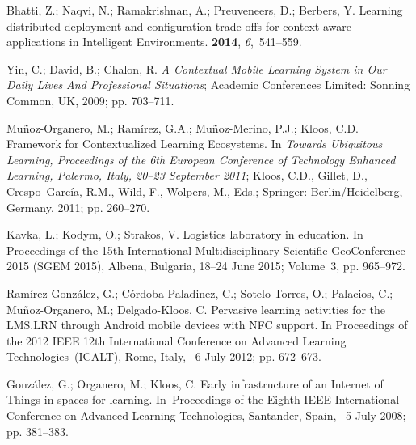 \documentclass[symmetry,article,accept,moreauthors,pdftex10pt,a4paper]{mdpi}
\begin{document}
\begin{thebibliography}{999}
Bhatti, Z.; Naqvi, N.; Ramakrishnan, A.; Preuveneers, D.; Berbers, Y.
\newblock Learning distributed deployment and configuration trade-offs for
context-aware applications in Intelligent Environments.
 {\bf
	2014}, {\em 6},~541--559.

Yin, C.; David, B.; Chalon, R.
\newblock \emph{A Contextual Mobile Learning System in Our Daily Lives And
	Professional Situations};
\newblock Academic Conferences Limited: Sonning Common, UK, 2009; pp. 703--711.

Mu{\~{n}}oz-Organero, M.; Ram{\'i}rez, G.A.; Mu{\~{n}}oz-Merino, P.J.; Kloos,
C.D. Framework for Contextualized Learning Ecosystems.
\newblock In {\em Towards Ubiquitous Learning, Proceedings of the 6th European Conference of
	Technology Enhanced Learning, Palermo, Italy, 20--23 September 
	2011}; Kloos, C.D., Gillet, D., Crespo~Garc{\'i}a, R.M., Wild,
F., Wolpers, M., Eds.; Springer: Berlin/Heidelberg, Germany, 2011;
pp. 260--270.

Kavka, L.; Kodym, O.; Strakos, V.
\newblock Logistics laboratory in education.
\newblock In Proceedings of the 15th International Multidisciplinary Scientific GeoConference 2015 (SGEM 2015), Albena, Bulgaria, 18--24 June 2015;
Volume~3, pp. 965--972.

Ramírez-González, G.; Córdoba-Paladinez, C.; Sotelo-Torres, O.; Palacios,
C.; Muñoz-Organero, M.; Delgado-Kloos, C.
\newblock Pervasive learning activities for the LMS.LRN through Android mobile
devices with NFC support. In Proceedings of the 2012 IEEE 12th International Conference on  Advanced Learning Technologies~(ICALT), Rome, Italy,
--6 July 2012; pp. 672--673.

González, G.; Organero, M.; Kloos, C.
\newblock Early infrastructure of an Internet of Things in spaces for learning. In~Proceedings of the Eighth IEEE International Conference on  Advanced Learning Technologies, Santander, Spain,
--5 July 2008; pp. 381--383.


\end{thebibliography}
\end{document}
